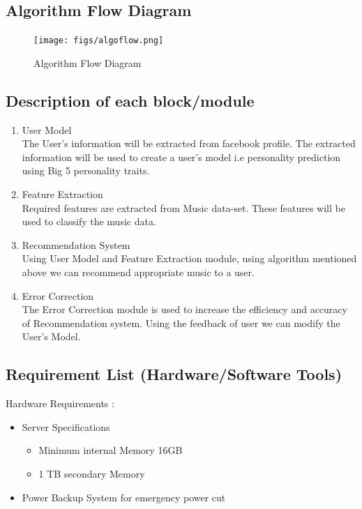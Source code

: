 \documentclass[a4paper,12pt]{article}
\begin{document}
\subsection{Algorithm Flow Diagram}
\begin{figure}[ht!]
  \centering
  \texttt{[image: figs/algoflow.png]}
  \caption{Algorithm Flow Diagram \label{fig:algoflow}}
\end{figure}

\subsection{Description of each block/module}

\begin{enumerate}
\item User Model\\
  The User's information will be extracted from facebook profile. The extracted information will be used to create a user's model i.e personality prediction using Big 5 personality traits.
\item Feature Extraction\\
  Required features are extracted from Music data-set. These features will be used to classify the music data.
\item Recommendation System\\
  Using User Model and Feature Extraction module, using algorithm mentioned above we can recommend appropriate music to a user.
\item Error Correction\\
  The Error Correction module is used to increase the efficiency and accuracy of Recommendation system. Using the feedback of user we can modify the User's Model.
\end{enumerate}
\cleardoublepage


\subsection{Requirement List (Hardware/Software Tools)}
Hardware Requirements :
\begin{itemize}
\item Server Specifications
  \begin{itemize}
  \item Minimum internal Memory 16GB
  \item 1 TB secondary Memory
  \end{itemize}
\item Power Backup System for emergency power cut
\end{itemize}
\end{document}
